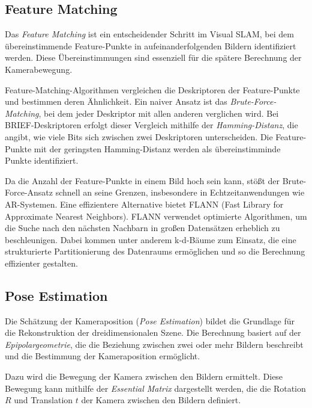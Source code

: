 \subsection{Feature Matching}

Das \emph{Feature Matching} ist ein entscheidender Schritt im Visual SLAM, bei dem übereinstimmende Feature-Punkte in aufeinanderfolgenden Bildern identifiziert werden. Diese Übereinstimmungen sind essenziell für die spätere Berechnung der Kamerabewegung. \cite{gao2021vSLAM, szeliski2022computerVision}

Feature-Matching-Algorithmen vergleichen die Deskriptoren der Feature-Punkte und bestimmen deren Ähnlichkeit. Ein naiver Ansatz ist das \emph{Brute-Force-Matching}, bei dem jeder Deskriptor mit allen anderen verglichen wird. Bei BRIEF-Deskriptoren erfolgt dieser Vergleich mithilfe der \emph{Hamming-Distanz}, die angibt, wie viele Bits sich zwischen zwei Deskriptoren unterscheiden. Die Feature-Punkte mit der geringsten Hamming-Distanz werden als übereinstimminde Punkte identifiziert. \cite{gao2021vSLAM, szeliski2022computerVision}

Da die Anzahl der Feature-Punkte in einem Bild hoch sein kann, stößt der Brute-Force-Ansatz schnell an seine Grenzen, insbesondere in Echtzeitanwendungen wie AR-Systemen. Eine effizientere Alternative bietet FLANN (Fast Library for Approximate Nearest Neighbors). FLANN verwendet optimierte Algorithmen, um die Suche nach den nächsten Nachbarn in großen Datensätzen erheblich zu beschleunigen. Dabei kommen unter anderem k-d-Bäume zum Einsatz, die eine strukturierte Partitionierung des Datenraums ermöglichen und so die Berechnung effizienter gestalten. \cite{gao2021vSLAM, muja2009flann}

\subsection{Pose Estimation}

Die Schätzung der Kameraposition (\emph{Pose Estimation}) bildet die Grundlage für die Rekonstruktion der dreidimensionalen Szene. Die Berechnung basiert auf der \emph{Epipolargeometrie}, die die Beziehung zwischen zwei oder mehr Bildern beschreibt und die Bestimmung der Kameraposition ermöglicht. \cite{gao2021vSLAM} 

Dazu wird die Bewegung der Kamera zwischen den Bildern ermittelt. Diese Bewegung kann mithilfe der \emph{Essential Matrix} dargestellt werden, die die Rotation \( R \) und Translation \( t \) der Kamera zwischen den Bildern definiert. \cite{gao2021vSLAM}

